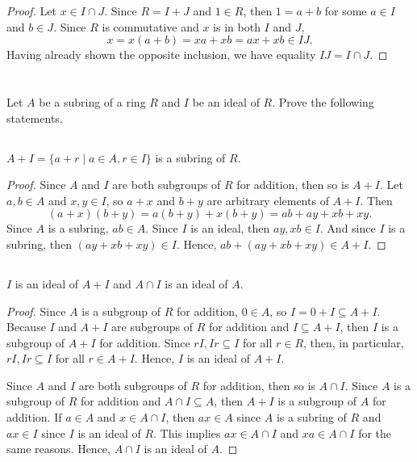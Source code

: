 \documentclass[12pt]{article}
\newenvironment{problem}
    {\begin{lrbox}{\mybox}\begin{minipage}{0.98\textwidth}}
    {\end{minipage}\end{lrbox}\begin{center}\framebox[\textwidth]{\usebox{\mybox}}\end{center}}
\theoremstyle{definition}
\begin{document}
\begin{proof}
    Let $x \in I \cap J$. Since $R = I + J$ and $1 \in R$, then $1 = a + b$ for some $a \in I$ and $b \in J$. Since $R$ is commutative and $x$ is in both $I$ and $J$,
    \[
        x = x(a + b) = xa + xb = ax + xb \in IJ.
    \]
    Having already shown the opposite inclusion, we have equality $IJ = I \cap J$.
    
\end{proof}

\newpage
\section{}
\begin{problem}
    Let $A$ be a subring of a ring $R$ and $I$ be an ideal of $R$. Prove the following statements.
\end{problem}

\subsection{}
\begin{problem}
    $A + I = \{a + r \mid a \in A, r \in I\}$ is a subring of $R$.
\end{problem}

\begin{proof}
    Since $A$ and $I$ are both subgroups of $R$ for addition, then so is $A + I$. Let $a, b \in A$ and $x, y \in I$, so $a + x$ and $b + y$ are arbitrary elements of $A + I$. Then
    \[
        (a + x)(b + y) = a(b + y) + x(b + y) = ab + ay + xb + xy.
    \]
    Since $A$ is a subring, $ab \in A$. Since $I$ is an ideal, then $ay, xb \in I$. And since $I$ is a subring, then $(ay + xb + xy) \in I$. Hence, $ab + (ay + xb + xy) \in A + I$.
\end{proof}

\subsection{}
\begin{problem}
    $I$ is an ideal of $A + I$ and $A \cap I$ is an ideal of $A$.
\end{problem}

\begin{proof}
    Since $A$ is a subgroup of $R$ for addition, $0 \in A$, so $I = 0 + I \subseteq A + I$. Because $I$ and $A + I$ are subgroups of $R$ for addition and $I \subseteq A + I$, then $I$ is a subgroup of $A + I$ for addition. Since $rI, Ir \subseteq I$ for all $r \in R$, then, in particular, $rI, Ir \subseteq I$ for all $r \in A + I$. Hence, $I$ is an ideal of $A + I$.
    
    Since $A$ and $I$ are both subgroups of $R$ for addition, then so is $A \cap I$. Since $A$ is a subgroup of $R$ for addition and $A \cap I \subseteq A$, then $A + I$ is a subgroup of $A$ for addition. If $a \in A$ and $x \in A \cap I$, then $ax \in A$ since $A$ is a subring of $R$ and $ax \in I$ since $I$ is an ideal of $R$. This implies $ax \in A \cap I$ and $xa \in A \cap I$ for the same reasons. Hence, $A \cap I$ is an ideal of $A$.
    
\end{proof}
\end{document}
